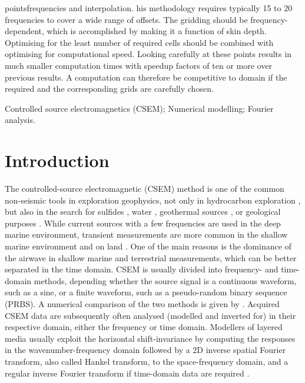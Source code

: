 \documentclass[extra, camera,%
    referee,     %
]{gji}
\begin{document}
\begin{summary}
{points}{frequencies} and interpolation. his methodology requires typically 15 to 20 frequencies to cover a
wide range of offsets.
%
The gridding should be frequency-dependent, which is
accomplished by making it a function of skin depth. Optimising for the least
number of required cells  should be combined
with optimising for computational speed.
%
Looking carefully at these  points results in much smaller
computation times with speedup factors of ten or more over previous results. A
 computation  can therefore be competitive to domain  if the required  and the corresponding grids are carefully chosen.
%
\end{summary}

\begin{keywords}
  Controlled source electromagnetics (CSEM); Numerical modelling; Fourier analysis.
\end{keywords}

\section{Introduction}  %

The controlled-source electromagnetic (CSEM) method is one of the common
non-seismic tools in exploration geophysics, not only in hydrocarbon
exploration \citep{GEO.10.Constable}, but also in the search for sulfides
\citep{GRL.19.Gehrmann}, water \citep{GEO.05.Pedersen}, geothermal sources
\citep{WGC.15.Girard}, or geological purposes \citep{NAT.19.Johanson}. While
current sources with a few frequencies are used in the deep marine environment,
transient measurements are more common in the shallow marine environment and on
land \citep[e.g., ][]{GEO.07.Ziolkowski, SEG.07.Andreis, SEG.07.Avdeeva}. One
of the main reasons is the dominance of the airwave in shallow marine and
terrestrial measurements, which can be better separated in the time domain.
CSEM is usually divided into frequency- and time-domain methods, depending
whether the source signal is a continuous waveform, such as a sine, or a finite
waveform, such as a pseudo-random binary sequence (PRBS). A numerical
comparison of the two methods is given by \cite{GP.13.Conell}. Acquired CSEM
data are subsequently often analysed (modelled and inverted for) in their
respective domain, either the frequency or time domain. Modellers of layered
media usually exploit the horizontal shift-invariance by computing the
responses in the wavenumber-frequency domain followed by a 2D inverse spatial
Fourier transform, also called Hankel transform, to the space-frequency domain,
and a regular inverse Fourier transform if time-domain data are required
\citep[e.g., ][]{GEO.15.Hunziker}.
\end{document}
